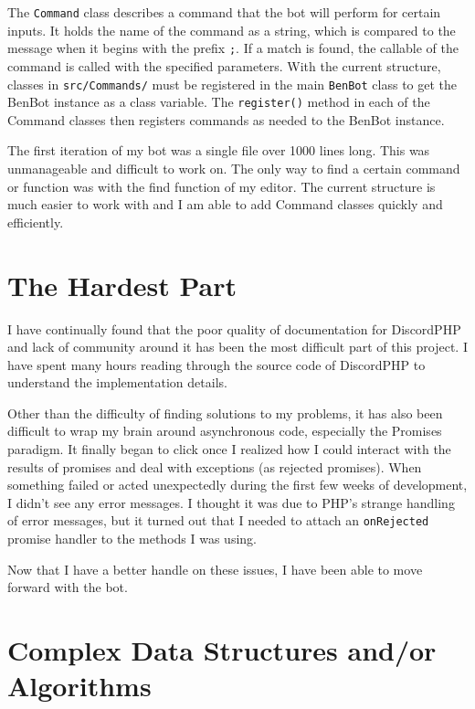 \documentclass[12pt]{article} %
\begin{document}
The \verb|Command| class describes a command that the bot will perform for certain inputs. It holds the name of the command as a string, which is compared to the message when it begins with the prefix \verb|;|. If a match is found, the callable of the command is called with the specified parameters. With the current structure, classes in \verb|src/Commands/| must be registered in the main \verb|BenBot| class to get the BenBot instance as a class variable. The \verb|register()| method in each of the Command classes then registers commands as needed to the BenBot instance.

The first iteration of my bot was a single file over 1000 lines long. This was unmanageable and difficult to work on. The only way to find a certain command or function was with the find function of my editor. The current structure is much easier to work with and I am able to add Command classes quickly and efficiently.


\section*{The Hardest Part}

I have continually found that the poor quality of documentation for DiscordPHP and lack of community around it has been the most difficult part of this project. I have spent many hours reading through the source code of DiscordPHP to understand the implementation details.

Other than the difficulty of finding solutions to my problems, it has also been difficult to wrap my brain around asynchronous code, especially the Promises paradigm. It finally began to click once I realized how I could interact with the results of promises and deal with exceptions (as rejected promises). When something failed or acted unexpectedly during the first few weeks of development, I didn't see any error messages. I thought it was due to PHP's strange handling of error messages, but it turned out that I needed to attach an \verb|onRejected| promise handler to the methods I was using.

Now that I have a better handle on these issues, I have been able to move forward with the bot.


\section*{Complex Data Structures and/or Algorithms}
\end{document}
